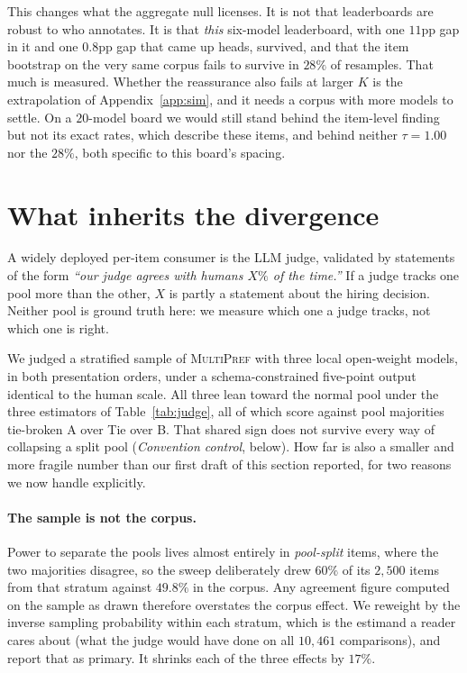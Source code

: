 \documentclass{article}
\begin{document}
This changes what the aggregate null licenses. It is not that leaderboards are robust to
who annotates. It is that \emph{this} six-model leaderboard, with one $11$pp gap in it and
one $0.8$pp gap that came up heads, survived, and that the item bootstrap on the very
same corpus fails to survive in $28\%$ of resamples. That much is measured. Whether the
reassurance also fails at larger $K$ is the extrapolation of Appendix~\ref{app:sim}, and it needs a corpus with
more models to settle. On a $20$-model board we would still stand behind the item-level
finding but not its exact rates, which describe these items, and behind neither
$\tau = 1.00$ nor the $28\%$, both specific to this board's spacing.

\section{What inherits the divergence}\label{sec:judge}

A widely deployed per-item consumer is the LLM judge, validated by
statements of the form \emph{``our judge agrees with humans $X\%$ of the time.''}
If a judge tracks one pool more than the other, $X$ is partly a statement about
the hiring decision. Neither pool is ground truth here: we measure which one a judge
tracks, not which one is right.

We judged a stratified sample of \textsc{MultiPref} with three local open-weight models,
in both presentation orders, under a schema-constrained five-point output identical to the
human scale. All three lean toward the normal pool under the three estimators of
Table~\ref{tab:judge}, all of which score against pool majorities tie-broken A over Tie
over B. That shared sign does not survive every way of collapsing a split pool
(\emph{Convention control}, below). How far is also a smaller and more fragile number than
our first draft of this section reported, for two reasons we now handle explicitly.

\paragraph{The sample is not the corpus.} Power to separate the pools lives almost entirely
in \emph{pool-split} items, where the two majorities disagree, so the sweep deliberately
drew $60\%$ of its $2{,}500$ items from that stratum against $49.8\%$ in the corpus. Any
agreement figure computed on the sample as drawn therefore overstates the corpus effect.
We reweight by the inverse sampling probability within each stratum, which is the estimand
a reader cares about (what the judge would have done on all $10{,}461$ comparisons),
and report that as primary. It shrinks each of the three effects by $17\%$.
\end{document}
